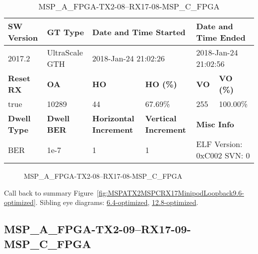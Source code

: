 \begin{table}[h]
\centering
\caption{MSP\_A\_FPGA-TX2-08--RX17-08-MSP\_C\_FPGA}
\label{tab:MSPAFPGATX208RX1708MSPCFPGA9.6-optimized}
\begin{tabular}{@{}|l|l|l|l|l|l|@{}}
\toprule
\textbf{SW Version}                & \textbf{GT Type}   & \multicolumn{2}{l|}{\textbf{Date and Time Started}}            & \multicolumn{2}{l|}{\textbf{Date and Time Ended}}        \\ \midrule
2017.2                       & UltraScale GTH          & \multicolumn{2}{l|}{2018-Jan-24 21:02:26}                   & \multicolumn{2}{l|}{2018-Jan-24 21:02:56}               \\ \midrule
\textbf{Reset RX}                  & \textbf{OA} & \textbf{HO}   & \textbf{HO (\%)} & \textbf{VO} & \textbf{VO (\%)} \\ \midrule
true & 10289        & 44          & 67.69\%        & 255        & 100.00\%       \\ \midrule
\textbf{Dwell Type}                & \textbf{Dwell BER} & \textbf{Horizontal Increment} & \textbf{Vertical Increment}    & \multicolumn{2}{l|}{\textbf{Misc Info}}                  \\ \midrule
BER                            & 1e-7        & 1        & 1           & \multicolumn{2}{l|}{ELF Version: 0xC002 SVN: 0}                         \\ \bottomrule
\end{tabular}
\end{table}

\begin{figure}[h]
\caption{MSP\_A\_FPGA-TX2-08--RX17-08-MSP\_C\_FPGA} \label{fig:MSPAFPGATX208RX1708MSPCFPGA9.6-optimized}
\end{figure}

Call back to summary Figure~\ref{fig:MSPATX2MSPCRX17MinipodLoopback9.6-optimized}.
Sibling eye diagrams: \hyperref[sec:MSPAFPGATX208RX1708MSPCFPGA6.4-optimized]{6.4-optimized}, \hyperref[sec:MSPAFPGATX208RX1708MSPCFPGA12.8-optimized]{12.8-optimized}.

\clearpage
\newpage


\subsection{MSP\_A\_FPGA-TX2-09--RX17-09-MSP\_C\_FPGA}\label{sec:MSPAFPGATX209RX1709MSPCFPGA9.6-optimized}

